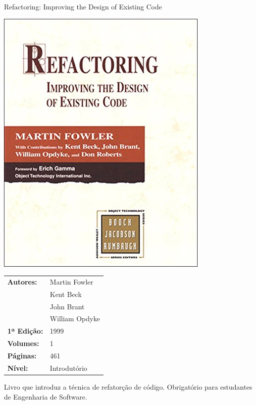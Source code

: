 \begin{frame}[fragile]{Refactoring: Improving the Design of Existing Code}

    \begin{minipage}{0.4\textwidth}
        \includegraphics[scale=0.25]{fowler.jpg}
    \end{minipage}
    \begin{minipage}{0.5\textwidth}
        \begin{small}
            \begin{tabularx}{0.95\textwidth}{lX}
                \textbf{Autores:} & Martin Fowler \\
                & Kent Beck \\
                & John Brant \\
                & William Opdyke \\
                \textbf{1ª Edição:} & 1999 \\
                \textbf{Volumes:} & 1 \\
                \textbf{Páginas:} & 461 \\
                \textbf{Nível:} & Introdutório \\
            \end{tabularx}
        \end{small}
    \end{minipage}

    \vspace{0.2in} 

    Livro que introduz a técnica de refatorção de código. Obrigatório para estudantes de
    Engenharia de Software.
\end{frame}

